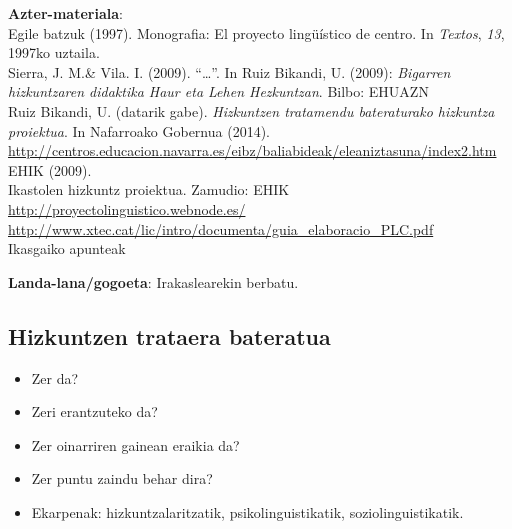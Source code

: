 \documentclass[
]{book}
\providecommand{\tightlist}{%
  \setlength{\itemsep}{0pt}\setlength{\parskip}{0pt}}
\begin{document}
\textbf{Azter-materiala}:\\
Egile batzuk (1997). Monografia: El proyecto lingüístico de centro. In \emph{Textos}, \emph{13}, 1997ko uztaila.\\
Sierra, J. M.\& Vila. I. (2009). ``\ldots{}''. In Ruiz Bikandi, U. (2009): \emph{Bigarren hizkuntzaren didaktika Haur eta Lehen Hezkuntzan}. Bilbo: EHUAZN\\
Ruiz Bikandi, U. (datarik gabe). \emph{Hizkuntzen tratamendu bateraturako hizkuntza proiektua}. In Nafarroako Gobernua (2014). \url{http://centros.educacion.navarra.es/eibz/baliabideak/eleaniztasuna/index2.htm}
EHIK (2009).\\
Ikastolen hizkuntz proiektua. Zamudio: EHIK\\
\url{http://proyectolinguistico.webnode.es/}~\\
\url{http://www.xtec.cat/lic/intro/documenta/guia_elaboracio_PLC.pdf}~\\
Ikasgaiko apunteak

\textbf{Landa-lana/gogoeta}: Irakaslearekin berbatu.

\hypertarget{hizkuntzen-trataera-bateratua-2}{%
\subsection*{Hizkuntzen trataera bateratua}\label{hizkuntzen-trataera-bateratua-2}}

\begin{itemize}
\tightlist
\item
  Zer da?
\item
  Zeri erantzuteko da?
\item
  Zer oinarriren gainean eraikia da?
\item
  Zer puntu zaindu behar dira?
\item
  Ekarpenak: hizkuntzalaritzatik, psikolinguistikatik, soziolinguistikatik.
\end{itemize}
\end{document}
